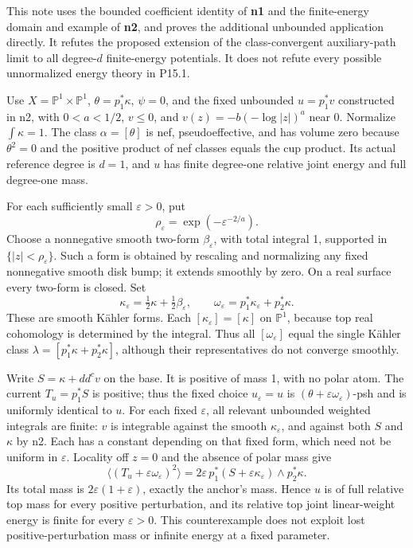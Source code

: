 \documentclass[
  11pt,
]{article}
\begin{document}
This note uses the bounded coefficient identity of \textbf{n1} and the
finite-energy domain and example of \textbf{n2}, and proves the
additional unbounded application directly. It refutes the proposed
extension of the class-convergent auxiliary-path limit to all
degree-\(d\) finite-energy potentials. It does not refute every possible
unnormalized energy theory in P15.1.

Use \(X=\mathbb{P}^1\times\mathbb{P}^1\), \(\theta=p_1^*\kappa\),
\(\psi=0\), and the fixed unbounded \(u=p_1^*v\) constructed in n2, with
\(0<a<1/2\), \(v\leq0\), and \(v(z)=-b(-\log|z|)^a\) near \(0\).
Normalize \(\int\kappa=1\). The class \(\alpha=[\theta]\) is nef,
pseudoeffective, and has volume zero because \(\theta^2=0\) and the
positive product of nef classes equals the cup product. Its actual
reference degree is \(d=1\), and \(u\) has finite degree-one relative
joint energy and full degree-one mass.

For each sufficiently small \(\varepsilon>0\), put \[
\rho_\varepsilon=\exp(-\varepsilon^{-2/a}).
\] Choose a nonnegative smooth two-form \(\beta_\varepsilon\), with
total integral 1, supported in \(\{|z|<\rho_\varepsilon\}\). Such a form
is obtained by rescaling and normalizing any fixed nonnegative smooth
disk bump; it extends smoothly by zero. On a real surface every two-form
is closed. Set \[
\kappa_\varepsilon=\tfrac12\kappa+\tfrac12\beta_\varepsilon,
\qquad
\omega_\varepsilon=p_1^*\kappa_\varepsilon+p_2^*\kappa.
\tag{23a}
\] These are smooth Kähler forms. Each \([\kappa_\varepsilon]=[\kappa]\)
on \(\mathbb{P}^1\), because top real cohomology is determined by the
integral. Thus all \([\omega_\varepsilon]\) equal the single Kähler
class \(\lambda=[p_1^*\kappa+p_2^*\kappa]\), although their
representatives do not converge smoothly.

Write \(S=\kappa+dd^cv\) on the base. It is positive of mass 1, with no
polar atom. The current \(T_u=p_1^*S\) is positive; thus the fixed
choice \(u_\varepsilon=u\) is
\((\theta+\varepsilon\omega_\varepsilon)\)-psh and is uniformly
identical to \(u\). For each fixed \(\varepsilon\), all relevant
unbounded weighted integrals are finite: \(v\) is integrable against the
smooth \(\kappa_\varepsilon\), and against both \(S\) and \(\kappa\) by
n2. Each has a constant depending on that fixed form, which need not be
uniform in \(\varepsilon\). Locality off \(z=0\) and the absence of
polar mass give \[
\langle(T_u+\varepsilon\omega_\varepsilon)^2\rangle
=2\varepsilon\,p_1^*(S+\varepsilon\kappa_\varepsilon)\wedge p_2^*\kappa.
\] Its total mass is \(2\varepsilon(1+\varepsilon)\), exactly the
anchor's mass. Hence \(u\) is of full relative top mass for every
positive perturbation, and its relative top joint linear-weight energy
is finite for every \(\varepsilon>0\). This counterexample does not
exploit lost positive-perturbation mass or infinite energy at a fixed
parameter.
\end{document}

